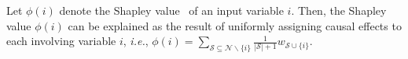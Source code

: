 \label{th:harsanyi-shapley-value}
Let {\small $\phi(i)$} denote the Shapley value~\cite{shapley1953value} of an input variable $i$.
Then, the Shapley value {\small$\phi(i)$} can be explained as the result of uniformly assigning causal effects to each involving variable {\small$i$}, \emph{i.e.}, {\small $\phi(i)=\sum_{\mathcal{S}\subseteq \mathcal{N}\backslash\{i\}}\frac{1}{|\mathcal{S}|+1} w_{\mathcal{S}\cup\{i\}}$}.
\label{theo:shapley}
